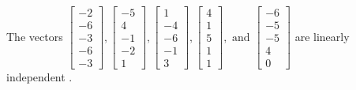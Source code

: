 \begin{exercise}
\begin{exerciseStatement}
  \end{exerciseStatement}
  \begin{exerciseAnswer}
   The vectors \(\left[\begin{array}{r}
-2 \\
-6 \\
-3 \\
-6 \\
-3
\end{array}\right] , \left[\begin{array}{r}
-5 \\
4 \\
-1 \\
-2 \\
1
\end{array}\right] , \left[\begin{array}{r}
1 \\
-4 \\
-6 \\
-1 \\
3
\end{array}\right] , \left[\begin{array}{r}
4 \\
1 \\
5 \\
1 \\
1
\end{array}\right] , \text{ and } \left[\begin{array}{r}
-6 \\
-5 \\
-5 \\
4 \\
0
\end{array}\right]\) are 
  	 linearly independent  .
  


  \end{exerciseAnswer}
\end{exercise}